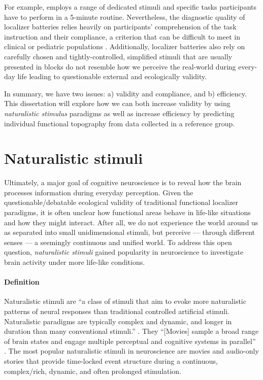 For example, \citet{pinel2007fast} employs a range of dedicated stimuli and
specific tasks participants have to perform in a 5-minute routine.
Nevertheless, the diagnostic quality of localizer batteries relies heavily on
participants' comprehension of the task instruction and their compliance, a
criterion that can be difficult to meet in clinical or pediatric populations
\citep{eickhoff2020towards, vanderwal2015inscapes, vanderwal2019movies}.
Additionally, localizer batteries also rely on carefully chosen and
tightly-controlled, simplified stimuli that are usually presented in blocks do
not resemble how we perceive the real-world during every-day life leading to
questionable external and ecologically validity.

In summary, we have two issues: a) validity and compliance, and b) efficiency.
This dissertation will explore how we can both increase validity by using
\textit{naturalistic stimulus} paradigms as well as increase efficiency by
predicting individual functional topography from data collected in a reference
group.


\section{Naturalistic stimuli}

Ultimately, a major goal of cognitive neuroscience is to reveal how the brain
processes information during everyday perception.
%
Given the questionable/debatable ecological validity of traditional functional
localizer paradigms, it is often unclear how functional areas behave in
life-like situations and how they might interact.
%
After all, we do not experience the world around us as separated into small
unidimensional stimuli, but perceive --- through different senses --- a
seemingly continuous and unified world.
%
To address this open question, \textit{naturalistic stimuli} gained popularity
in neuroscience to investigate brain activity under more life-like conditions.


\paragraph{Definition}

Naturalistic stimuli are ``a class of stimuli that aim to evoke more
naturalistic patterns of neural responses than traditional controlled artificial
stimuli. Naturalistic paradigms are typically complex and dynamic, and longer in
duration than many conventional stimuli.'' \citep{vanderwal2019movies}.
%
They ``[Movies] sample a broad range of brain states and engage multiple
perceptual and cognitive systems in parallel'' \citep{haxby2020naturalistic}.
The most popular naturalistic stimuli in neuroscience are movies and audio-only
stories that provide time-locked event structure during a continuous,
complex/rich, dynamic, and often prolonged stimulation.


